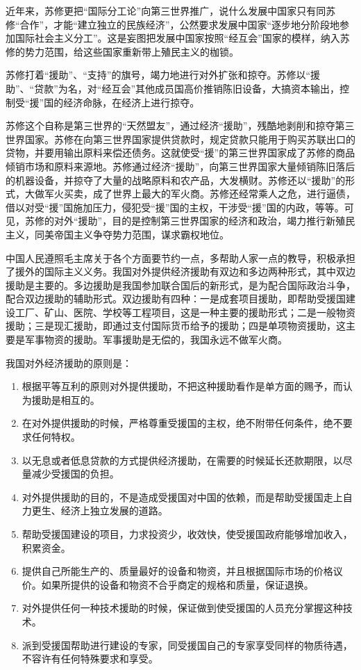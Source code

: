 \documentclass{book}
\begin{document}
近年来，苏修更把“国际分工论”向第三世界推广，说什么发展中国家只有同苏修“合作”，才能“建立独立的民族经济”，公然要求发展中国家“逐步地分阶段地参加国际社会主义分工”。这是妄图把发展中国家按照“经互会”国家的模样，纳入苏修的势力范围，给这些国家重新带上殖民主义的枷锁。

苏修打着“援助”、“支持”的旗号，竭力地进行对外扩张和掠夺。苏修以“援助”、“贷款”为名，对“经互会”其他成员国高价推销陈旧设备，大搞资本输出，控制受“援”国的经济命脉，在经济上进行掠夺。

苏修这个自称是第三世界的“天然盟友”，通过经济“援助”，残酷地剥削和掠夺第三世界国家。苏修在向第三世界国家提供贷款时，规定贷款只能用于购买苏联出口的贷物，并要用输出原料来偿还债务。这就使受“援”的第三世界国家成了苏修的商品倾销市场和原料来源地。苏修通过经济“援助”，向第三世界国家大量倾销陈旧落后的机器设备，并掠夺了大量的战略原料和农产品，大发横财。苏修还以“援助”的形式，大做军火买卖，成了世界上最大的军火商。苏修还经常乘人之危，进行逼债，借以对受“援”国施加压力，侵犯受“援”国的主权，干涉受“援”国的内政，等等。可见，苏修的对外“援助”，目的是控制第三世界国家的经济和政治，竭力推行新殖民主义，同美帝国主义争夺势力范围，谋求霸权地位。

中国人民遵照毛主席关于各个方面要节约一点，多帮助人家一点的教导，积极承担了援外的国际主义义务。我国对外提供经济援助有双边和多边两种形式，其中双边援助是主要的。多边援助是我国参加联合国后的新形式，是为配合国际政治斗争，配合双边援助的辅助形式。双边援助有四种：一是成套项目援助，即帮助受援国建设工厂、矿山、医院、学校等工程项目，这是一种主要的援助形式；二是一般物资援助；三是现汇援助，即通过支付国际货币给予的援助；四是单项物资援助，这主要是军事物资的援助。军事援助是无偿的，我国永远不做军火商。

我国对外经济援助的原则是：

 \begin{enumerate}

\item 根据平等互利的原则对外提供援助，不把这种援助看作是单方面的赐予，而认为援助是相互的。
\item 在对外提供援助的时候，严格尊重受援国的主权，绝不附带任何条件，绝不要求任何特权。
\item 以无息或者低息贷款的方式提供经济援助，在需要的时候延长还款期限，以尽量减少受援国的负担。
\item 对外提供援助的目的，不是造成受援国对中国的依赖，而是帮助受援国走上自力更生、经济上独立发展的道路。
\item 帮助受援国建设的项目，力求投资少，收效快，使受援国政府能够增加收入，积累资金。
\item 提供自己所能生产的、质量最好的设备和物资，并且根据国际市场的价格议价。如果所提供的设备和物资不合乎商定的规格和质量，保证退换。
\item 对外提供任何一种技术援助的时候，保证做到使受援国的人员充分掌握这种技术。
\item 派到受援国帮助进行建设的专家，同受援国自己的专家享受同样的物质待遇，不容许有任何特殊要求和享受。

 \end{enumerate}
\end{document}
